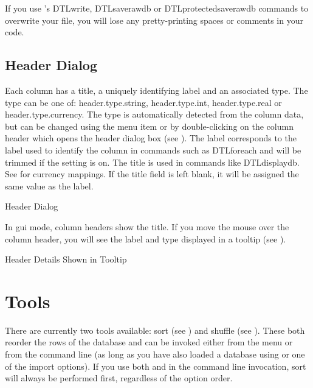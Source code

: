 \begin{important}
If you use 's \gls{DTLwrite},
\gls{DTLsaverawdb} or \gls{DTLprotectedsaverawdb} commands to
overwrite your file, you will lose any pretty-printing spaces or
comments in your code.
\end{important}

\section{Header Dialog}\label{sec:editheader}

Each column has a title, a uniquely identifying label
and an associated type. The type can be one of:
\gls{header.type.string}, 
\gls{header.type.int}, 
\gls{header.type.real} or 
\gls{header.type.currency}.
The type is automatically detected from the column data,
but can be changed using the 
menu item or by double-clicking on the column header which opens the 
header dialog box (see ). The label corresponds 
to the label used to identify the column in commands such
as \gls{DTLforeach} and will be trimmed if the 
 setting is on. The title is used in 
commands like \gls{DTLdisplaydb}. See  for 
currency mappings. If the title field is left blank, it will be assigned 
the same value as the label.

 {%
 }
 {Header Dialog}

In \gls{gui} mode, column headers show the
title. If you move the mouse over the column header, you will see the
label and type displayed in a tooltip (see 
).

 {%
 }
 {Header Details Shown in Tooltip}

\chapter{Tools}\label{sec:tools}

There are currently two tools available: sort (see )
and shuffle (see ). These both reorder the rows of the
database and can be invoked either from the  menu
or from the command line (as long as
you have also loaded a database using  or one of the
import options). If you use both  and 
in the command line invocation, sort will always be performed first, 
regardless of the option order.

